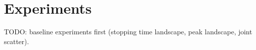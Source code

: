 \section{Experiments}\label{sec:experiments}

TODO: baseline experiments first (stopping time landscape, peak landscape, joint scatter).

